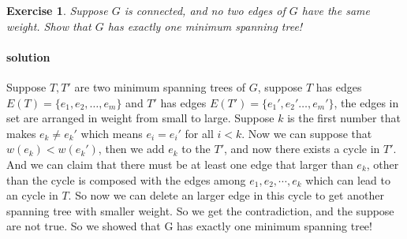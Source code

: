 \documentclass[12pt,a4]{article}
\newtheorem{exercise}[theorem]{Exercise}
\begin{document}
\begin{exercise}
  Suppose $G$ is connected, and no two edges of $G$ have the same weight. 
  Show that $G$ has exactly one minimum spanning tree!
\end{exercise}

\paragraph{solution}
Suppose $T, T'$ are two minimum spanning trees of $G$, suppose $T$ has edges $E(T) = \{ e_1, e_2, \dots, e_m\}$ and $T'$ has edges $E(T') = \{e_1', e_2' \dots, e_m'\}$, the edges in set are arranged 
in weight from small to large. Suppose $k$ is the first number that
makes $e_k \neq e_k'$ which means $e_i = e_i'$ for all $i < k$. Now we can suppose that $w(e_k) < w(e_k')$, then we add $e_k$ to the $T'$, and now there exists a cycle in $T'$. And we can claim
that there must be at least one edge that larger than $e_k$, other than the cycle is composed with the edges among $e_1, e_2, \cdots, e_{k}$ which can lead to an cycle in $T$. So now we can delete 
an larger edge in this cycle to get another spanning tree
with smaller weight. So we get the contradiction, and the suppose are not true. So we showed that G has exactly one minimum spanning tree!
\end{document}
